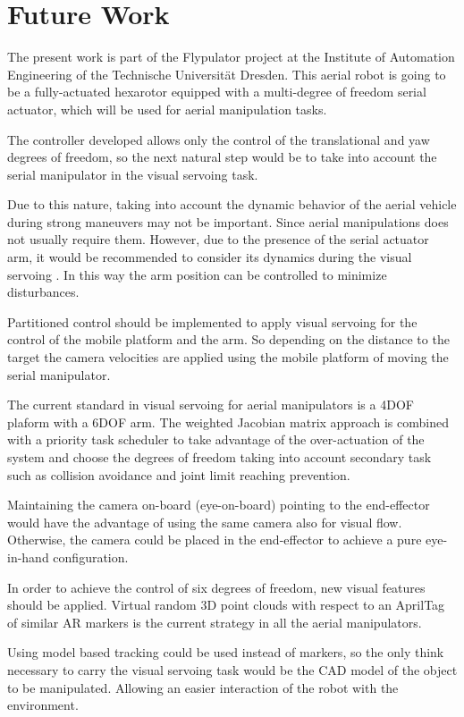 
\chapter{Future Work}
\label{chap:future-work}

The present work is part of the Flypulator project at the Institute of Automation Engineering of the Technische Universität Dresden. This aerial robot is going to be a fully-actuated hexarotor equipped with a multi-degree of freedom serial actuator, which will be used for aerial manipulation tasks.

The controller developed allows only the control of the translational and yaw degrees of freedom, so the next natural step would be to take into account the serial manipulator in the visual servoing task.

Due to this nature, taking into account the dynamic behavior of the aerial vehicle during strong maneuvers may not be important. Since aerial manipulations does not usually require them. However, due to the presence of the serial actuator arm, it would be recommended to consider its dynamics during the visual servoing . In this way the arm position can be controlled to minimize disturbances.

Partitioned control should be implemented to apply visual servoing for the control of the mobile platform and the arm. So depending on the distance to the target the camera velocities are applied using the mobile platform of moving the serial manipulator.

The current standard in visual servoing for aerial manipulators is a 4DOF plaform with a 6DOF arm. The weighted Jacobian matrix approach is combined with a priority task scheduler to take advantage of the over-actuation of the system and choose the degrees of freedom taking into account secondary task such as collision avoidance and joint limit reaching prevention.

Maintaining the camera on-board (eye-on-board) pointing to the end-effector would have the advantage of using the same camera also for visual flow. Otherwise, the camera could be placed in the end-effector to achieve a pure eye-in-hand configuration.

In order to achieve the control of six degrees of freedom, new visual features should be applied. Virtual random 3D point clouds with respect to an AprilTag of similar AR markers is the current strategy in all the aerial manipulators.

Using model based tracking could be used instead of markers, so the only think necessary to carry the visual servoing task would be the CAD model of the object to be manipulated. Allowing an easier interaction of the robot with the environment.